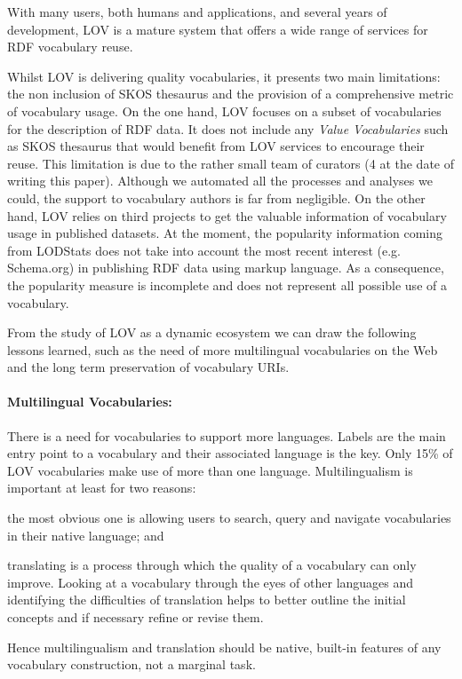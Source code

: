 \documentclass{iosart2c}
\begin{document}
With many users, both humans and applications, and several years of development, LOV is a mature system that offers a wide range of services for RDF vocabulary reuse. 

Whilst LOV is delivering quality vocabularies, it presents two main limitations: the non inclusion of SKOS thesaurus and the provision of a comprehensive metric of vocabulary usage. On the one hand, LOV focuses on a subset of vocabularies for the description of RDF data. It does not include any \emph{Value Vocabularies} such as SKOS thesaurus that would benefit from LOV services to encourage their reuse. This limitation is due to the rather small team of curators (4 at the date of writing this paper). Although we automated all the processes and analyses we could, the support to vocabulary authors is far from negligible. 
On the other hand, LOV relies on third projects to get the valuable information of vocabulary usage in published datasets. At the moment, the popularity information coming from LODStats does not take into account the most recent interest (e.g. Schema.org) in publishing RDF data using markup language. As a consequence, the popularity measure is incomplete and does not represent all possible use of a vocabulary. 

From the study of LOV as a dynamic ecosystem we can draw the following lessons learned, such as the need of more multilingual vocabularies on the Web and the long term preservation of vocabulary URIs. 
\paragraph{Multilingual Vocabularies:}
There is a need for vocabularies to support more languages. Labels are the main entry point to a vocabulary and their associated language is the key. Only 15\% of LOV vocabularies make use of more than one language. Multilingualism is important at least for two reasons: 
\begin{inparaenum}[1)] 
	\item the most obvious one is allowing users to search, query and navigate vocabularies in their native language; and
	\item translating is a process through which the quality of a vocabulary can only improve. Looking at a vocabulary through the eyes of other languages and identifying the difficulties of translation helps to better outline the initial concepts and if necessary refine or revise them. 
\end{inparaenum} 
Hence multilingualism and translation should be native, built-in features of any vocabulary construction, not a marginal task.
\end{document}
